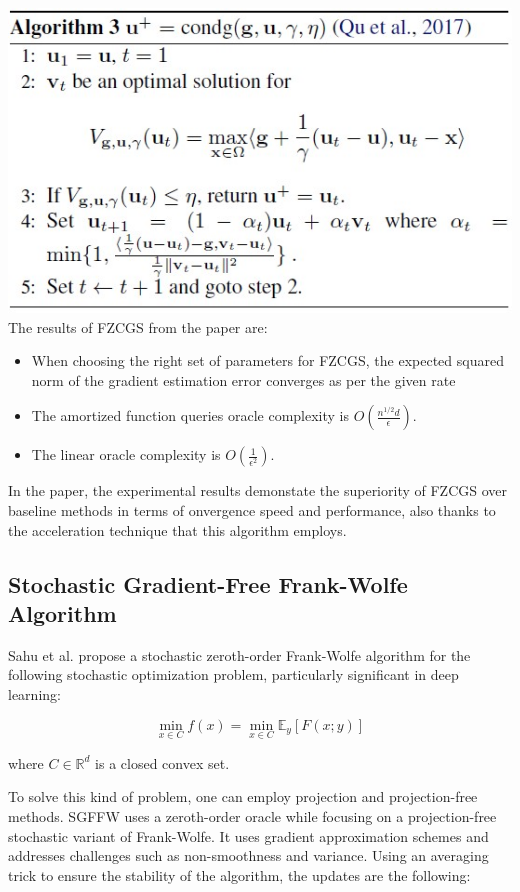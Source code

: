 \documentclass[10pt,twocolumn,letterpaper]{article}
\begin{document}
\includegraphics*[scale=0.7]{img/condg_pseudocode.jpg} \\


The results of FZCGS from the paper are:

\begin{itemize}
   \item When choosing the right set of parameters for FZCGS, the expected squared norm of the gradient estimation error converges as per the given rate
   \item The amortized function queries oracle complexity is $O\left(\frac{n^{1 / 2} d}{\epsilon}\right)$.
   \item The linear oracle complexity is $O\left(\frac{1}{\epsilon^{2}}\right)$.
\end{itemize}

In the paper, the experimental results demonstate the superiority of FZCGS over baseline methods
in terms of onvergence speed and performance, also thanks to the acceleration technique that this algorithm employs.

\subsection{Stochastic Gradient-Free Frank-Wolfe Algorithm}

Sahu et al. propose a stochastic zeroth-order Frank-Wolfe algorithm for the following stochastic
optimization problem, particularly significant in deep learning:

\[
\min _{x \in C} f(x)=\min _{x \in C} \mathbb{E}_{y}[F(x ; y)]
\]

where $C \in \mathbb{R}^{d}$ is a closed convex set.

To solve this kind of problem, one can employ projection and projection-free methods.
SGFFW uses a zeroth-order oracle while focusing on a projection-free stochastic variant
of Frank-Wolfe. It uses gradient approximation schemes and addresses challenges such as non-smoothness
and variance. Using an averaging trick to ensure the stability of the algorithm,
the updates are the following:
\end{document}
